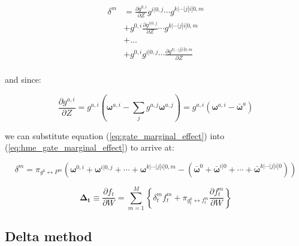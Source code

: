 \documentclass[12pt]{article}
\newcommand{\mean}[1]{\bar{#1}}
\newcommand{\gateprod}[2]{\pi_{#1 \longleftrightarrow #2}}
\begin{document}
\begin{equation} \label{eq:hme_gate_marginal_effect}
  \begin{split}
    \delta^{m} &= \frac{\partial g^{0, i}}{\partial Z} g^{i|0, j} \cdots g^{k|\cdots|j|i|0, m} \\
                                     &+ g^{0, i} \frac{\partial g^{i|0, j}}{\partial Z} \cdots g^{k|\cdots|j|i|0, m} \\
                                     &+ \dots                                                                        \\
                                     &+ g^{0, i} g^{i|0, j} \cdots \frac{\partial g^{k|\cdots|j|i|0, m}}{\partial Z} \\
  \end{split}
\end{equation}

and since:

\begin{equation} \label{eq:gate_marginal_effect}
  \frac{\partial g^{a, i}}{\partial Z} = g^{a, i} \left( \boldsymbol{\omega}^{a, i} - \sum_{j} g^{a, j} \boldsymbol{\omega}^{a, j} \right) = g^{a, i} \left( \boldsymbol{\omega}^{a, i} - \mean{\boldsymbol{\omega}}^{a} \right)
\end{equation}

we can substitute equation (\ref{eq:gate_marginal_effect}) into
(\ref{eq:hme_gate_marginal_effect}) to arrive at:

\begin{equation} \label{eq:marginal_effects}
  \delta^{m} = \gateprod{g^{0}}{P^{m}} \left(\boldsymbol{\omega}^{0, i} + \boldsymbol{\omega}^{i|0, j} + \cdots + \boldsymbol{\omega}^{k|\cdots|j|i|0, m} - \left( \mean{\boldsymbol{\omega}}^{0} + \mean{\boldsymbol{\omega}}^{i|0} + \cdots + \mean{\boldsymbol{\omega}}^{k|\cdots|j|i|0} \right) \right)
\end{equation}


\begin{equation} \label{eq:ME_both2}
  \boldsymbol{\Delta_{t}} \equiv \frac{\partial f_{t}}{\partial W} = \sum_{m=1}^{M} \left\{ \delta^{m}_{t} f^{m}_{t} + \gateprod{g^{0}_{t}}{f^{m}_{t}} \frac{\partial f^{m}_{t}}{{\partial W}} \right\}
\end{equation}


\subsection{Delta method}
\end{document}
